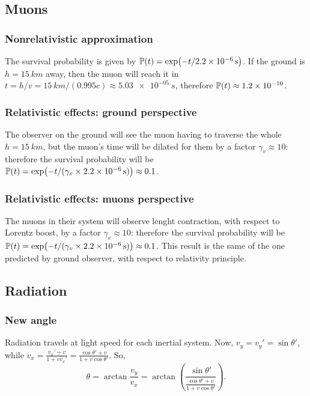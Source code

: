 \documentclass[main.tex]{subfiles}
\begin{document}
\subsection{Muons}

\subsubsection{Nonrelativistic approximation}

The survival probability is given by \(\mathbb{P} (t) = \exp(-t/ \SI{2.2e-6}{s})\). If the ground is \( h =\SI{15}{km} \) away, then the muon will reach it in \(t = h/v = \SI{15}{km} / (0.995c) \approx \SI{5.03e-05}{s}\), therefore \(\mathbb{P}(t) \approx \num{1.2e-10} \).

\subsubsection{Relativistic effects: ground perspective}

The observer on the ground will see the muon having to traverse the whole \(h = \SI{15}{km} \), but the muon's time will be dilated for them by a factor \(\gamma_v \approx 10\): therefore the survival probability
will be \(\mathbb{P}(t) = \exp(- t / (\gamma_v \times \SI{2.2e-6}{s})) \approx 0.1\).


\subsubsection{Relativistic effects: muons perspective}

The muons in their system will observe lenght contraction, with respect to Lorentz boost, by a factor \(\gamma_v \approx 10\): therefore the survival probability
will be \(\mathbb{P}(t) = \exp(- t / (\gamma_v \times \SI{2.2e-6}{s})) \approx 0.1\). This result is the same of the one predicted by ground observer, with respect to relativity principle.
\subsection{Radiation}

\subsubsection{New angle}
Radiation travels at light speed for each inertial system. Now, $v_y=v_y'=\sin\theta'$, while $v_x=\frac{v_x'+v}{1+vv_x'}=\frac{\cos\theta'+v}{1+v\cos\theta'}$. So,
\begin{equation}
\theta=\arctan\frac{v_y}{v_x}=\arctan\left(\frac{\sin\theta'}{\frac{\cos\theta'+v}{1+v\cos\theta'}}\right).
\end{equation}
\end{document}
